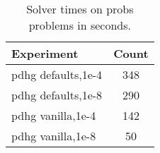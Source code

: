 \begin{table}
\centering
\caption{Solver times on probs problems in seconds.}
\label{t:solved-probs}
\begin{tabular}{lc}
\toprule
        Experiment &  Count \\
\midrule
pdhg defaults,1e-4 &    348 \\
pdhg defaults,1e-8 &    290 \\
 pdhg vanilla,1e-4 &    142 \\
 pdhg vanilla,1e-8 &     50 \\
\bottomrule
\end{tabular}
\end{table}

